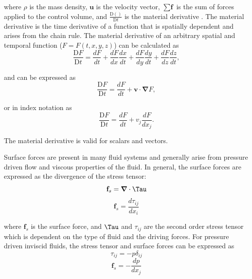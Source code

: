 \noindent where $\rho$ is the mass density, $\textbf{u}$ is the velocity vector, $\sum \textbf{f}$ is the sum of forces applied to the control volume, and $\frac{\text{D}()}{\text{D}t}$ is the material derivative \cite{probstein_physicochemical_2005}. The material derivative is the time derivative of a function that is spatially dependent and arises from the chain rule. The material derivative of an arbitrary spatial and temporal function ($F = F(t,x,y,z)$) can be calculated as
\begin{equation}
    \frac{\text{D}F}{\text{D}t} = \frac{dF}{dt} + \frac{dF}{dx}\frac{dx}{dt} + \frac{dF}{dy}\frac{dy}{dt} + \frac{dF}{dz}\frac{dz}{dt},
\end{equation}

and can be expressed as 
\begin{equation}
    \frac{\text{D}F}{\text{D}t} = \frac{dF}{dt} + \textbf{v} \cdot \boldsymbol{\nabla}F,
\end{equation}

or in index notation as
\begin{equation}
    \frac{\text{D}F}{\text{D}t} = \frac{dF}{dt} + v_j\frac{dF}{dx_j}.
\end{equation}

\noindent The material derivative is valid for scalars and vectors.

\par Surface forces are present in many fluid systems and generally arise from pressure driven flow and viscous properties of the fluid. In general, the surface forces are expressed as the divergence of the stress tensor:
\begin{equation}
    \textbf{f}_s = \boldsymbol{\nabla} \cdot \Tau
\end{equation}
\begin{equation}
    \textbf{f}_s = \frac{d\tau_{ij}}{dx_i}
\end{equation}

\noindent where $\textbf{f}_s$ is the surface force, and $\Tau$ and $\tau_{ij}$ are the second order stress tensor which is dependent on the type of fluid and the driving forces. For pressure driven inviscid fluids, the stress tensor and surface forces can be expressed as 
\begin{equation}
    \tau_{ij} = -p\delta_{ij}
\end{equation}
\begin{equation}
    \textbf{f}_s = - \frac{dp}{dx_j}
\end{equation}


